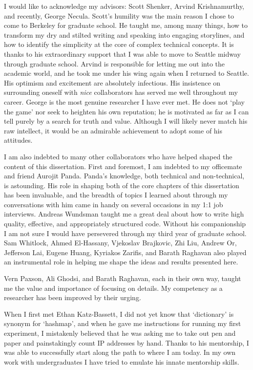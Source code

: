 \begin{acknowledgements}

I would like to acknowledge my advisors: Scott Shenker, Arvind
Krishnamurthy, and recently, George Necula. Scott's humility was the main reason I chose to
come to Berkeley for graduate school. He taught me, among many things, how to
transform my dry and stilted writing and speaking into engaging storylines,
and how to identify the simplicity at the core of complex technical
concepts. It is thanks to his extraordinary support that I was able to move to Seattle midway through
graduate school. Arvind is responsible for
letting me out into the academic world, and he took me under his wing again
when I returned to Seattle. His optimism and
excitement are absolutely infectious. His insistence on
surrounding
oneself with \textit{nice} collaborators has served me well throughout my
career. George is the most genuine researcher I have ever met. He does
not `play the game' nor seek to heighten his own reputation; he is motivated
as far as I can tell purely by a search for truth and value. Although I
will likely never match his raw intellect, it would be an admirable
achievement to adopt some of his attitudes.

I am also indebted to many other collaborators who have helped shaped the
content of this dissertation. First and foremost, I am indebted to my
officemate and friend Aurojit Panda. Panda's knowledge, both technical and non-technical,
is astounding. His role in shaping both of the core chapters of this
dissertation has been invaluable, and the breadth of
topics I learned about through my conversations with
him came in handy on several occasions in my 1:1 job interviews. Andreas Wundsman taught me a great deal about
how to write high quality, effective, and appropriately structured code. Without his companionship I am not sure I
would have persevered through my third year of graduate school. Sam Whitlock,
Ahmed El-Hassany, Vjekoslav Brajkovic, Zhi Liu, Andrew Or, Jefferson Lai,
Eugene Huang, Kyriakos Zarifis, and Barath Raghavan also played an
instrumental role in helping me shape the ideas and results presented here.

Vern Paxson, Ali Ghodsi, and Barath Raghavan, each in their own way, taught me
the value and importance of focusing on details. My competency as a researcher
has been improved by their urging.

When I first met Ethan Katz-Bassett, I did not yet know that `dictionary' is
synonym for `hashmap', and when he gave me instructions for running my first experiment,
I mistakenly believed that he was asking me to take
out pen and paper and painstakingly count IP addresses by hand. Thanks to his
mentorship, I was able to successfully start along the path to where I am today.
In my own work with undergraduates I have tried to emulate his innate
mentorship skills.


\end{acknowledgements}
